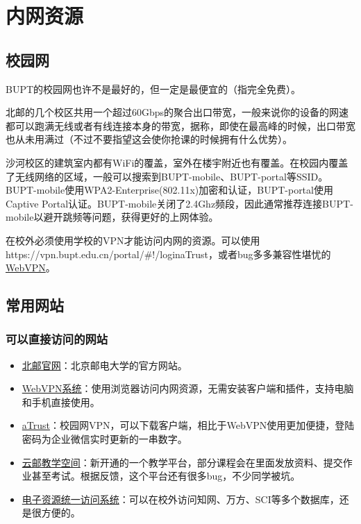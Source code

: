 \section{内网资源}

\subsection{校园网}

BUPT的校园网也许不是最好的，但一定是最便宜的（指完全免费）。

北邮的几个校区共用一个超过60Gbps的聚合出口带宽，一般来说你的设备的网速都可以跑满无线或者有线连接本身的带宽，据称，即使在最高峰的时候，出口带宽也从未用满过（不过不要指望这会使你抢课的时候拥有什么优势）。

沙河校区的建筑室内都有WiFi的覆盖，室外在楼宇附近也有覆盖。在校园内覆盖了无线网络的区域，一般可以搜索到BUPT-mobile、BUPT-portal等SSID。BUPT-mobile使用WPA2-Enterprise(802.11x)加密和认证，BUPT-portal使用Captive Portal认证。BUPT-mobile关闭了2.4Ghz频段，因此通常推荐连接BUPT-mobile以避开跳频等问题，获得更好的上网体验。

在校外必须使用学校的VPN才能访问内网的资源。可以使用{https://vpn.bupt.edu.cn/portal/#!/login}{aTrust}，或者bug多多兼容性堪忧的\href{https://webvpn.bupt.edu.cn/}{WebVPN}。

\subsection{常用网站}

\subsubsection*{可以直接访问的网站}
\begin{itemize}
    \item \href{https://www.bupt.edu.cn/}{北邮官网}：北京邮电大学的官方网站。
    \item \href{https://webvpn.bupt.edu.cn/}{WebVPN系统}：使用浏览器访问内网资源，无需安装客户端和插件，支持电脑和手机直接使用。
    \item \href{https://vpn.bupt.edu.cn/}{aTrust}：校园网VPN，可以下载客户端，相比于WebVPN使用更加便捷，登陆密码为企业微信实时更新的一串数字。
    \item \href{https://ucloud.bupt.edu.cn/}{云邮教学空间}：新开通的一个教学平台，部分课程会在里面发放资料、提交作业甚至考试。根据反馈，这个平台还有很多bug，不少同学被坑。
    \item \href{https://libcon.bupt.edu.cn/}{电子资源统一访问系统}：可以在校外访问知网、万方、SCI等多个数据库，还是很方便的。
\end{itemize}

